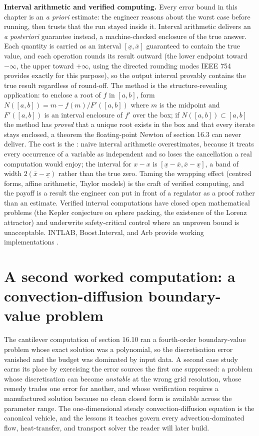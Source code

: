 \begin{mastery}
\textbf{Interval arithmetic and verified computing.} Every error bound in
this chapter is an \emph{a priori} estimate: the engineer reasons about the
worst case before running, then trusts that the run stayed inside it. Interval
arithmetic delivers an \emph{a posteriori} guarantee instead, a machine-checked
enclosure of the true answer. Each quantity is carried as an interval
$[\underline{x}, \overline{x}]$ guaranteed to contain the true value, and
each operation rounds its result outward (the lower endpoint toward
$-\infty$, the upper toward $+\infty$, using the directed rounding modes IEEE
754 provides exactly for this purpose), so the output interval provably
contains the true result regardless of round-off. The  method is the structure-revealing application: to enclose a root of
$f$ in $[a, b]$, form $N([a,b]) = m - f(m)/F'([a,b])$ where $m$ is the
midpoint and $F'([a,b])$ is an interval enclosure of $f'$ over the box; if
$N([a,b]) \subset [a,b]$ the method has \emph{proved} that a unique root
exists in the box and that every iterate stays enclosed, a theorem the
floating-point Newton of section 16.3 can never deliver. The cost is the
: naive interval arithmetic overestimates, because
it treats every occurrence of a variable as independent and so loses the
cancellation a real computation would enjoy; the interval for $x - x$ is
$[\underline{x} - \overline{x}, \overline{x} - \underline{x}]$, a band of
width $2(\overline{x} - \underline{x})$ rather than the true zero. Taming the
wrapping effect (centred forms, affine arithmetic, Taylor models) is the
craft of verified computing, and the payoff is a result the engineer can put
in front of a regulator as a proof rather than an estimate. Verified interval
computations have closed open mathematical problems (the Kepler conjecture on
sphere packing, the existence of the Lorenz attractor) and underwrite
safety-critical control where an unproven bound is unacceptable. INTLAB,
Boost.Interval, and Arb provide working implementations
\cite[ch.~26]{text:higham-numerical}.
\end{mastery}

\section{A second worked computation: a convection-diffusion boundary-value problem}

The cantilever computation of section 16.10 ran a fourth-order
boundary-value problem whose exact solution was a polynomial, so the
discretisation error vanished and the budget was dominated by input data.
A second case study earns its place by exercising the error sources the
first one suppressed: a problem whose discretisation can become
\emph{unstable} at the wrong grid resolution, whose remedy trades one error
for another, and whose verification requires a manufactured solution because
no clean closed form is available across the parameter range. The
one-dimensional steady convection-diffusion equation is the canonical
vehicle, and the lessons it teaches govern every advection-dominated flow,
heat-transfer, and transport solver the reader will later build.

